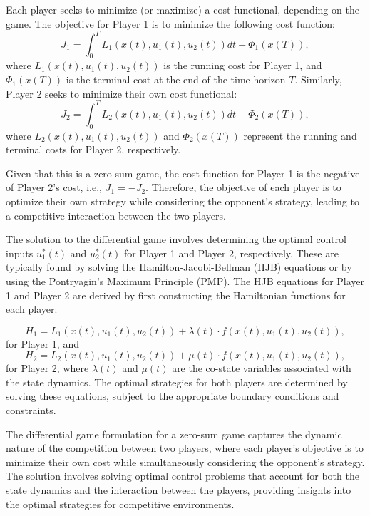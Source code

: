 \documentclass[conference]{IEEEtran}
\begin{document}
Each player seeks to minimize (or maximize) a cost functional, depending on the game. The objective for Player 1 is to minimize the following cost function:
\begin{equation}
    J_1 = \int_{0}^{T} L_1(x(t), u_1(t), u_2(t)) dt + \Phi_1(x(T)),
\end{equation}
where \( L_1(x(t), u_1(t), u_2(t)) \) is the running cost for Player 1, and \( \Phi_1(x(T)) \) is the terminal cost at the end of the time horizon \( T \). Similarly, Player 2 seeks to minimize their own cost functional:
\begin{equation}
    J_2 = \int_{0}^{T} L_2(x(t), u_1(t), u_2(t)) dt + \Phi_2(x(T)),
\end{equation}
where \( L_2(x(t), u_1(t), u_2(t)) \) and \( \Phi_2(x(T)) \) represent the running and terminal costs for Player 2, respectively.

Given that this is a zero-sum game, the cost function for Player 1 is the negative of Player 2's cost, i.e., \( J_1 = -J_2 \). Therefore, the objective of each player is to optimize their own strategy while considering the opponent's strategy, leading to a competitive interaction between the two players.

The solution to the differential game involves determining the optimal control inputs \( u_1^*(t) \) and \( u_2^*(t) \) for Player 1 and Player 2, respectively. These are typically found by solving the Hamilton-Jacobi-Bellman (HJB) equations or by using the Pontryagin's Maximum Principle (PMP). The HJB equations for Player 1 and Player 2 are derived by first constructing the Hamiltonian functions for each player:

\begin{equation}
    H_1 = L_1(x(t), u_1(t), u_2(t)) + \lambda(t) \cdot f(x(t), u_1(t), u_2(t)),
\end{equation}
for Player 1, and
\begin{equation}
    H_2 = L_2(x(t), u_1(t), u_2(t)) + \mu(t) \cdot f(x(t), u_1(t), u_2(t)),
\end{equation}
for Player 2, where \( \lambda(t) \) and \( \mu(t) \) are the co-state variables associated with the state dynamics. The optimal strategies for both players are determined by solving these equations, subject to the appropriate boundary conditions and constraints.

The differential game formulation for a zero-sum game captures the dynamic nature of the competition between two players, where each player's objective is to minimize their own cost while simultaneously considering the opponent's strategy. The solution involves solving optimal control problems that account for both the state dynamics and the interaction between the players, providing insights into the optimal strategies for competitive environments.
\end{document}
